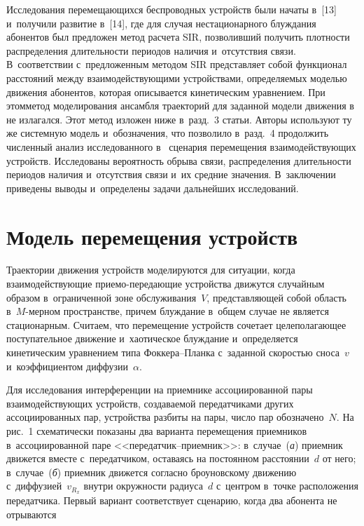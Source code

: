 \begin{multicols}{2}
Исследования перемещающихся беспроводных устройств были 
начаты в~[13] и~получили развитие в~[14], где для случая нестационарного 
блуж\-да\-ния абонентов был предложен метод расчета SIR, позволивший 
получить плотности распределения длительности периодов наличия 
и~отсутствия связи. В~соответствии с~предложенным методом  
SIR представляет собой функционал расстояний между 
взаимодействующими устройствами, опре\-де\-ля\-емых моделью движения 
абонентов, которая описывается кинетическим уравнением. При этом\linebreak метод 
моделирования ансамбля траекторий для заданной модели движения  
в~\cite{14-g1} не излагался. Этот метод изложен ниже в~разд.~3 статьи. Авторы 
используют ту же системную модель и~обозначения, что позволило в~разд.~4 
продолжить численный анализ исследованного в~\cite{14-g1} сценария 
перемещения взаимодействующих устройств. Исследованы вероятность обрыва 
связи, распределения длительности периодов наличия и~отсутствия связи и~их 
средние значения. В~заключении приведены выводы и~определены задачи 
дальнейших исследований.
  
\section{Модель перемещения устройств}

  Траектории движения устройств моделируются для ситуации, когда 
взаимодействующие при\-емо-пе\-ре\-да\-ющие устройства движутся случайным 
\mbox{образом} в~ограниченной зоне обслуживания~$V$, пред\-став\-ля\-ющей собой 
область в~$M$-мер\-ном пространстве, причем блуждание в~общем случае не 
является стационарным. Считаем, что перемещение устройств сочетает 
целеполагающее поступательное движение и~хаотическое блуждание 
и~определяет\-ся кинетическим уравнением типа Фок\-ке\-ра--План\-ка 
с~заданной скоростью сноса~$v$ и~коэффициентом диффузии~$\alpha$.
  


  Для исследования интерференции на приемнике ассоциированной пары 
взаимодействующих устройств, создаваемой передатчиками других 
ассоциированных пар, устройства разбиты на пары, число пар обозначено~$N$. 
На рис.~1 схематически показаны два варианта перемещения приемников 
в~ассоциированной паре <<пе\-ре\-дат\-чик--при\-ем\-ник>>: в~случае~(\textit{а}) 
приемник движется вместе с~передатчиком, оставаясь на постоянном 
расстоянии~$d$ от него; в~случае~(\textit{б}) приемник движется согласно броуновскому 
движению с~диффузией~$v_{R_x}$ внутри окружности радиуса~$d$ с~центром 
в~точке расположения передатчика. Первый вариант соответствует сценарию, 
когда два абонента не отрываются\linebreak


\end{multicols}
